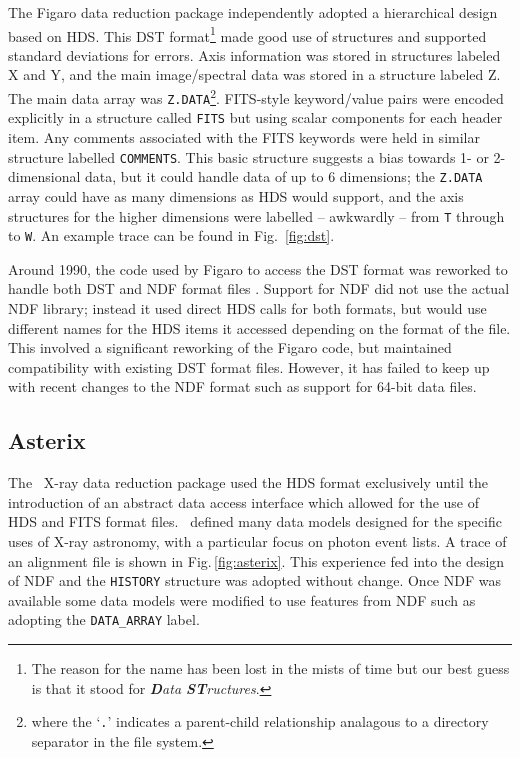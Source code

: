 \documentclass[final,authoryear,5p,times,twocolumn]{elsarticle}
\begin{document}
The Figaro data reduction package
\citep[][ascl:1203.013]{1988igbo.conf..448C,1993ASPC...52..219S}
independently adopted a hierarchical design based on HDS. This DST
format\footnote{The reason for the name has been lost in the mists of
  time but our best guess is that it stood for \emph{\textbf{D}ata
    \textbf{ST}ructures}.} made good use of structures and supported
standard deviations for errors. Axis information was stored in
structures labeled X and Y, and the main image/spectral data was
stored in a structure labeled Z. The main data array was
\texttt{Z.DATA}\footnote{where the `\texttt{.}' indicates a
  parent-child relationship analagous to a directory separator in the
  file system.}. FITS-style keyword/value pairs were encoded
explicitly in a structure called \texttt{FITS} but using scalar
components for each header item. Any comments associated with the FITS
keywords were held in similar structure labelled
\texttt{COMMENTS}. This basic structure suggests a bias towards 1- or
2-dimensional data, but it could handle data of up to 6 dimensions;
the \texttt{Z.DATA} array could have as many dimensions as HDS would
support, and the axis structures for the higher dimensions were
labelled -- awkwardly -- from \texttt{T} through to \texttt{W}. An
example trace can be found in Fig.~\ref{fig:dst}.

Around 1990, the code used by Figaro to access the DST format was
reworked to handle both DST and NDF format files
\citep{1990STARB...6...18S}. Support for NDF did
not use the actual NDF library; instead it used direct HDS calls for
both formats, but would use different names for the HDS items it
accessed depending on the format of the file. This involved a
significant reworking of the Figaro code, but maintained compatibility
with existing DST format files. However, it has failed to keep up with
recent changes to the NDF format such as support for 64-bit data
files.

\subsection{Asterix}

The \asterix\ X-ray data reduction package
\citep{1987JBIS...40..185P,SUN98,1992STARB...9....3S} used the HDS
format exclusively until the introduction of an abstract data access
interface \citep{1995ASPC...77..199A} which allowed for the use of HDS
and FITS format files. \asterix\ defined many data models designed for
the specific uses of X-ray astronomy, with a particular focus on
photon event lists. A trace of an alignment file is shown in
Fig.\,\ref{fig:asterix}. This experience fed into the design of NDF
and the \texttt{HISTORY} structure was adopted without change. Once
NDF was available some data models were modified to use features from
NDF such as adopting the \texttt{DATA\_ARRAY} label.
\end{document}
